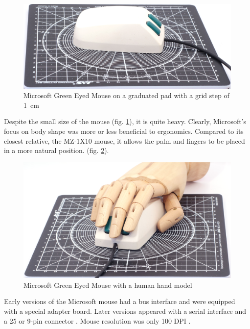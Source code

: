 \documentclass[11pt, a4paper]{article}
\begin{document}
\begin{figure}[h]
    \centering
    \includegraphics[scale=0.5]{1983_microsoft_green_eyed_mouse/size_30.jpg}
    \caption{Microsoft Green Eyed Mouse on a graduated pad with a grid step of 1~cm}
    \label{fig:MicrosoftGreenEyedSize}
\end{figure}

Despite the small size of the mouse (fig. \ref{fig:MicrosoftGreenEyedSize}), it is quite heavy. Clearly, Microsoft's focus on body shape was more or less beneficial to ergonomics. Compared to its closest relative, the MZ-1X10 mouse, it allows the palm and fingers to be placed in a more natural position. (fig. \ref{fig:MicrosoftGreenEyedHand}).

\begin{figure}[h]
    \centering
    \includegraphics[scale=0.5]{1983_microsoft_green_eyed_mouse/hand_30.jpg}
    \caption{Microsoft Green Eyed Mouse with a human hand model}
    \label{fig:MicrosoftGreenEyedHand}
\end{figure}

Early versions of the Microsoft mouse had a bus interface and were equipped with a special adapter board. Later versions appeared with a serial interface and a 25 or 9-pin connector \cite{mouses}. Mouse resolution was only 100 DPI \cite{review}.
\end{document}
